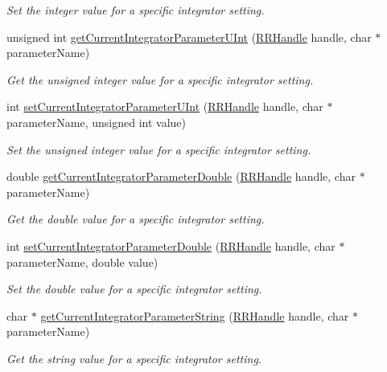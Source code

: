\begin{DoxyCompactItemize}
\begin{DoxyCompactList}\small\item\em Set the integer value for a specific integrator setting. \end{DoxyCompactList}\item 
unsigned int \hyperlink{group__simopts_ga3f5772f9a764e74036b994c290a99a86}{get\+Current\+Integrator\+Parameter\+U\+Int} (\hyperlink{rrc__types_8h_a1d68f0592372208fa5a5f2799ea4b3ae}{R\+R\+Handle} handle, char $\ast$parameter\+Name)
\begin{DoxyCompactList}\small\item\em Get the unsigned integer value for a specific integrator setting. \end{DoxyCompactList}\item 
int \hyperlink{group__simopts_gaba7305c74494496bffde25aa431ce638}{set\+Current\+Integrator\+Parameter\+U\+Int} (\hyperlink{rrc__types_8h_a1d68f0592372208fa5a5f2799ea4b3ae}{R\+R\+Handle} handle, char $\ast$parameter\+Name, unsigned int value)
\begin{DoxyCompactList}\small\item\em Set the unsigned integer value for a specific integrator setting. \end{DoxyCompactList}\item 
double \hyperlink{group__simopts_gad859b0cb1724ab3aeee81230c2da272a}{get\+Current\+Integrator\+Parameter\+Double} (\hyperlink{rrc__types_8h_a1d68f0592372208fa5a5f2799ea4b3ae}{R\+R\+Handle} handle, char $\ast$parameter\+Name)
\begin{DoxyCompactList}\small\item\em Get the double value for a specific integrator setting. \end{DoxyCompactList}\item 
int \hyperlink{group__simopts_ga90d69322c437f56d551c14445b57bb5a}{set\+Current\+Integrator\+Parameter\+Double} (\hyperlink{rrc__types_8h_a1d68f0592372208fa5a5f2799ea4b3ae}{R\+R\+Handle} handle, char $\ast$parameter\+Name, double value)
\begin{DoxyCompactList}\small\item\em Set the double value for a specific integrator setting. \end{DoxyCompactList}\item 
char $\ast$ \hyperlink{group__simopts_ga11536f253e0b43f8a282bf3bdfaf1328}{get\+Current\+Integrator\+Parameter\+String} (\hyperlink{rrc__types_8h_a1d68f0592372208fa5a5f2799ea4b3ae}{R\+R\+Handle} handle, char $\ast$parameter\+Name)
\begin{DoxyCompactList}\small\item\em Get the string value for a specific integrator setting. \end{DoxyCompactList}\item 

\end{DoxyCompactItemize}
